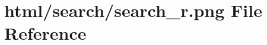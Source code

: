 \hypertarget{search__r_8png}{}\section{html/search/search\+\_\+r.png File Reference}
\label{search__r_8png}
